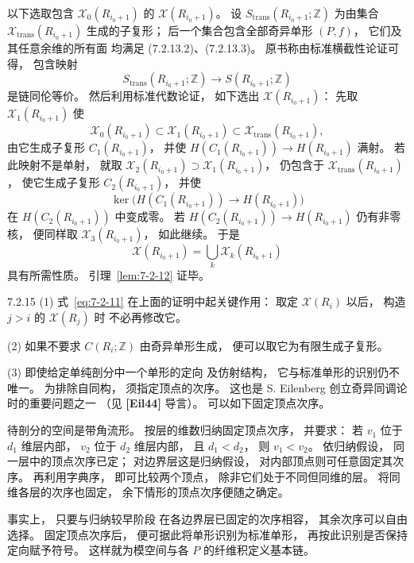 以下选取包含
$\mathcal X_0(R_{i_0+1})$
的 $\mathcal X(R_{i_0+1})$。
设 $S_{\mathrm{trans}}(R_{i_0+1};\mathbb Z)$
为由集合
$\mathcal X_{\mathrm{trans}}(R_{i_0+1})$
生成的子复形；
后一个集合包含全部奇异单形
$(P,f)$，
它们及其任意余维的所有面
均满足 (7.2.13.2)、(7.2.13.3)。
原书称由标准横截性论证可得，
包含映射
\[
S_{\mathrm{trans}}(R_{i_0+1};\mathbb Z)
\longrightarrow S(R_{i_0+1};\mathbb Z)
\]
是链同伦等价。
然后利用标准代数论证，
如下选出 $\mathcal X(R_{i_0+1})$：
先取
$\mathcal X_1(R_{i_0+1})$
使
\[
\mathcal X_0(R_{i_0+1})
\subset\mathcal X_1(R_{i_0+1})
\subset\mathcal X_{\mathrm{trans}}(R_{i_0+1}),
\]
由它生成子复形
$C_1(R_{i_0+1})$，
并使
$H(C_1(R_{i_0+1}))\to H(R_{i_0+1})$
满射。
若此映射不是单射，
就取
$\mathcal X_2(R_{i_0+1})
\supset\mathcal X_1(R_{i_0+1})$，
仍包含于
$\mathcal X_{\mathrm{trans}}(R_{i_0+1})$，
使它生成子复形
$C_2(R_{i_0+1})$，
并使
\[
\ker\bigl(
H(C_1(R_{i_0+1}))
\longrightarrow H(R_{i_0+1})
\bigr)
\]
在 $H(C_2(R_{i_0+1}))$ 中变成零。
若
$H(C_2(R_{i_0+1}))\to H(R_{i_0+1})$
仍有非零核，
便同样取
$\mathcal X_3(R_{i_0+1})$，
如此继续。
于是
\[
\mathcal X(R_{i_0+1})
=\bigcup_k\mathcal X_k(R_{i_0+1})
\]
具有所需性质。
引理~\ref{lem:7-2-12} 证毕。

\begin{remark}{7.2.15}\label{rem:7-2-15}
\textup{(1)}
式~\eqref{eq:7-2-11}
在上面的证明中起关键作用：
取定 $\mathcal X(R_i)$ 以后，
构造 $j>i$ 的
$\mathcal X(R_j)$ 时
不必再修改它。

\textup{(2)}
如果不要求 $C(R_i;\mathbb Z)$
由奇异单形生成，
便可以取它为有限生成子复形。

\textup{(3)}
即使给定单纯剖分中一个单形的定向
及仿射结构，
它与标准单形的识别仍不唯一。
为排除自同构，
须指定顶点的次序。
这也是 S. Eilenberg
创立奇异同调论时的重要问题之一
（见 \textbf{[Eil44]} 导言）。
可以如下固定顶点次序。

待剖分的空间是带角流形。
按层的维数归纳固定顶点次序，
并要求：
若 $v_1$ 位于 $d_1$ 维层内部，
$v_2$ 位于 $d_2$ 维层内部，
且 $d_1<d_2$，
则 $v_1<v_2$。
依归纳假设，
同一层中的顶点次序已定；
对边界层这是归纳假设，
对内部顶点则可任意固定其次序。
再利用字典序，
即可比较两个顶点，
除非它们处于不同但同维的层。
将同维各层的次序也固定，
余下情形的顶点次序便随之确定。

事实上，
只要与归纳较早阶段
在各边界层已固定的次序相容，
其余次序可以自由选择。
固定顶点次序后，
便可据此将单形识别为标准单形，
再按此识别是否保持定向赋予符号。
这样就为模空间与各 $P$
的纤维积定义基本链。
\end{remark}

